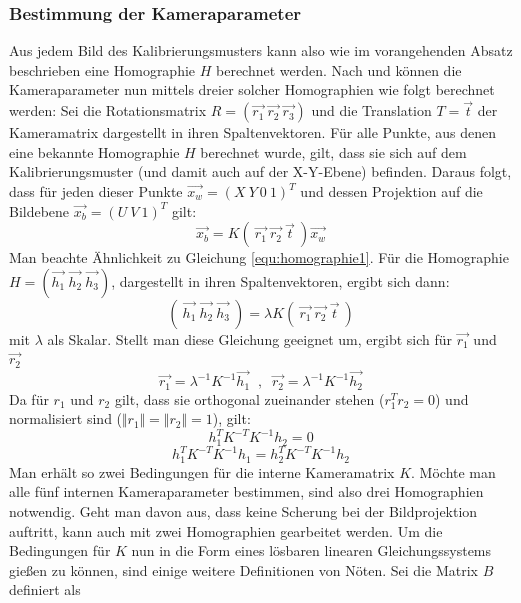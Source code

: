 \subsubsection{Bestimmung der Kameraparameter}
Aus jedem Bild des Kalibrierungsmusters kann also wie im vorangehenden Absatz beschrieben eine Homographie \(H\) berechnet werden. Nach \cite{Zhang:00} und \cite{Rahmann} können die Kameraparameter nun mittels dreier solcher Homographien wie folgt berechnet werden: 
\newline
Sei die Rotationsmatrix \(R = \left(\vec{r_1}\:\vec{r_2}\:\vec{r_3}\right)\) und die Translation \(T = \vec{t}\) der Kameramatrix dargestellt in ihren Spaltenvektoren. Für alle Punkte, aus denen eine bekannte Homographie \(H\) berechnet wurde, gilt, dass sie sich auf dem Kalibrierungsmuster (und damit auch auf der X-Y-Ebene) befinden. Daraus folgt, dass für jeden dieser Punkte \(\vec{x_{w}} = (X\:Y\:0\:1)^{T}\) und dessen Projektion auf die Bildebene \(\vec{x_{b}} = (U\:V\:1)^{T}\) gilt:
\begin{equation}
	\vec{x_{b}} = K\left(\:\vec{r_1}\:\vec{r_2}\:\vec{t}\:\right)\vec{x_{w}}
\end{equation}
Man beachte Ähnlichkeit zu Gleichung \ref{equ:homographie1}. Für die Homographie  \(H = \left(\vec{h_1}\:\vec{h_2}\:\vec{h_3}\right)\), dargestellt in ihren Spaltenvektoren, ergibt sich dann:
\begin{equation}
\label{equ:kameraparam3}
	\left(\:\vec{h_1}\:\vec{h_2}\:\vec{h_3}\:\right) = \lambda K\left(\:\vec{r_1}\:\vec{r_2}\:\vec{t}\:\right)
\end{equation}
mit \(\lambda\) als Skalar. Stellt man diese Gleichung geeignet um, ergibt sich für \(\vec{r_1}\) und \(\vec{r_2}\)
\begin{equation}
\vec{r_1} = \lambda^{-1} K^{-1}\vec{h_1} \;\;,\;\; \vec{r_2} = \lambda^{-1} K^{-1} \vec{h_2}
\end{equation}
Da für \(r_1\) und \(r_2\) gilt, dass sie orthogonal zueinander stehen (\(r_1^Tr_2=0\)) und normalisiert sind (\(\Vert r_1 \Vert = \Vert r_2 \Vert = 1\)), gilt:
\begin{equation}
\label{equ:kameraparam1}
	h_1^{T} K^{-T} K^{-1} h_2 = 0
\end{equation}
\begin{equation}
\label{equ:kameraparam2}
	h_1^{T} K^{-T} K^{-1} h_1 = h_2^{T} K^{-T} K^{-1} h_2
\end{equation}
Man erhält so zwei Bedingungen für die interne Kameramatrix \(K\). Möchte man alle fünf internen Kameraparameter bestimmen, sind also drei Homographien notwendig. Geht man davon aus, dass keine Scherung bei der Bildprojektion auftritt, kann auch mit zwei Homographien gearbeitet werden. Um die Bedingungen für \(K\) nun in die Form eines lösbaren linearen Gleichungssystems gießen zu können, sind einige weitere Definitionen von Nöten. Sei die Matrix \(B\) definiert als
